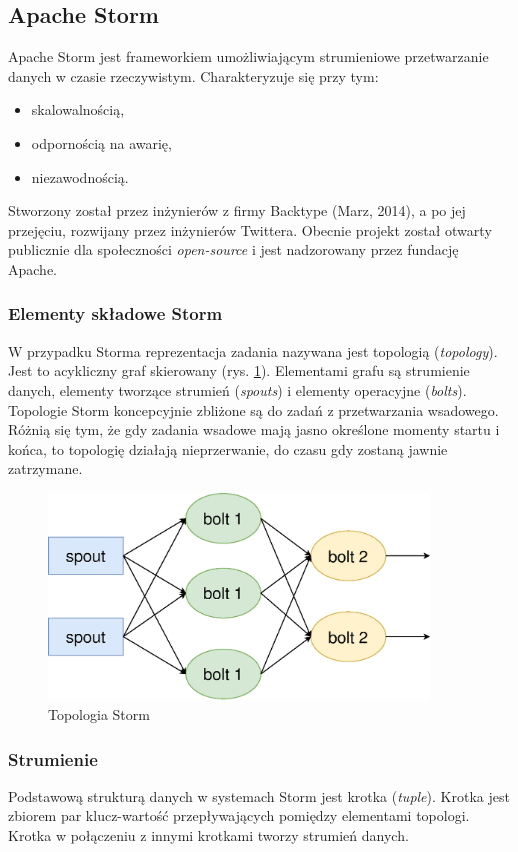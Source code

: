 \subsection{Apache Storm}
Apache Storm jest frameworkiem umożliwiającym strumieniowe przetwarzanie danych w czasie rzeczywistym.
Charakteryzuje się przy tym:
\begin{itemize}
  \item skalowalnością,
  \item odpornością na awarię,
  \item niezawodnością.
\end{itemize}
Stworzony został przez inżynierów z firmy
Backtype (Marz, 2014),
a po jej przejęciu, rozwijany przez inżynierów Twittera.
Obecnie projekt został otwarty publicznie dla społeczności \textit{open-source}
i jest nadzorowany przez fundację Apache.

\subsubsection*{Elementy składowe Storm}
\label{subs:StormElemets}
W przypadku Storma reprezentacja zadania nazywana jest topologią (\textit{topology}).
Jest to acykliczny graf skierowany (rys. \ref{fig:StormTopology}).
Elementami grafu są strumienie danych,
elementy tworzące strumień (\textit{spouts})
i elementy operacyjne (\textit{bolts}).
Topologie Storm koncepcyjnie zbliżone są do zadań z przetwarzania wsadowego.
Różnią się tym,
że gdy zadania wsadowe mają jasno określone momenty startu i końca,
to topologię działają nieprzerwanie, do czasu gdy zostaną jawnie zatrzymane.
\begin{figure}[htbp]
  \centering
  \includegraphics[width=0.9\textwidth]{img/storm}
  \caption{Topologia Storm}
  \label{fig:StormTopology}
\end{figure}

\subsubsection*{Strumienie}
Podstawową strukturą danych w systemach Storm jest krotka (\textit{tuple}).
Krotka jest zbiorem par klucz-wartość przepływających pomiędzy elementami topologi.
Krotka w połączeniu z innymi krotkami tworzy strumień danych.
